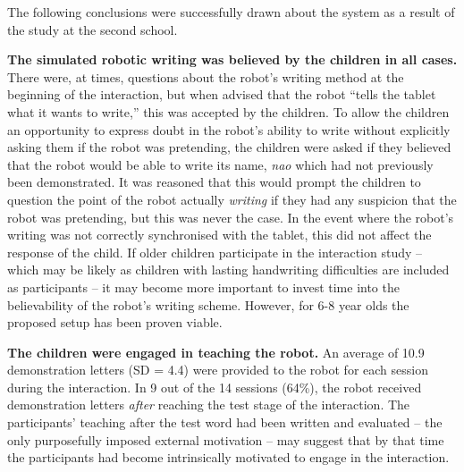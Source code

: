 \documentclass{sig-alternate}
\begin{document}
The following conclusions were successfully drawn about the system as a result
of the study at the second school.


    \textbf{The simulated robotic writing was believed by the children in all
    cases.} There were, at times, 
    questions about the robot's writing method at the beginning of the interaction,
    but when advised that the robot ``tells the tablet what it wants to write,''
    this was accepted by the children. To allow the children an opportunity to
    express doubt in the robot's ability to write without explicitly asking them if
    the robot was pretending, the children were asked if they believed that the
    robot would be able to write its name, \emph{{\sc nao}} which had not previously been
    demonstrated. It was reasoned that this would prompt the children to question
    the point of the robot actually \emph{writing} if they had any suspicion that
    the robot was pretending, but this was never the case. In the event where the
    robot's writing was not correctly synchronised with the tablet, this did not affect the
    response of the child. If older children participate in the interaction study --
    which may be likely as children with lasting handwriting difficulties are included
    as participants -- it may become more important to invest time into the
    believability of the robot's writing scheme. However, for 6-8 year olds the
    proposed setup has been proven viable.

    \textbf{The children were engaged in teaching the robot.} %
    An average of 10.9 demonstration letters (SD = 4.4) were
    provided to the robot for each session during the interaction.
    In 9 out of the 14 sessions (64\%), the robot received demonstration letters
    \emph{after} reaching the test stage of the interaction. The participants'
    teaching after the test word had been written and evaluated -- the only
    purposefully imposed external motivation -- may suggest that by that time
    the participants had become intrinsically motivated to engage in the
    interaction.%
\end{document}
